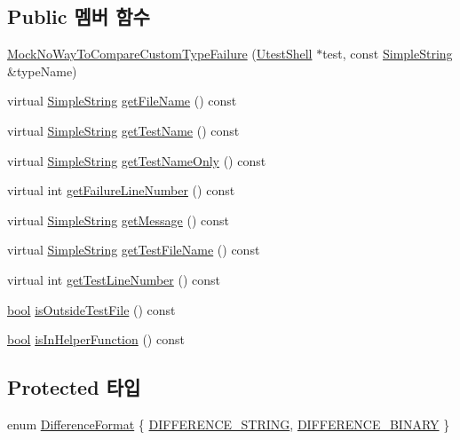 \subsection*{Public 멤버 함수}
\begin{DoxyCompactItemize}
\item 
\hyperlink{class_mock_no_way_to_compare_custom_type_failure_a5c1347c3850c5cfbf44f1cc8eecebdf4}{Mock\+No\+Way\+To\+Compare\+Custom\+Type\+Failure} (\hyperlink{class_utest_shell}{Utest\+Shell} $\ast$test, const \hyperlink{class_simple_string}{Simple\+String} \&type\+Name)
\item 
virtual \hyperlink{class_simple_string}{Simple\+String} \hyperlink{class_test_failure_ac74fa65c497d9a175304a14ffafcaa1a}{get\+File\+Name} () const 
\item 
virtual \hyperlink{class_simple_string}{Simple\+String} \hyperlink{class_test_failure_a02da3865d8c38e5fd122a08a5e23773e}{get\+Test\+Name} () const 
\item 
virtual \hyperlink{class_simple_string}{Simple\+String} \hyperlink{class_test_failure_ac5e7fcbcf3831504c42ee41691b0a7e7}{get\+Test\+Name\+Only} () const 
\item 
virtual int \hyperlink{class_test_failure_a9d41f8ad9667ed1f471676d49a655ec7}{get\+Failure\+Line\+Number} () const 
\item 
virtual \hyperlink{class_simple_string}{Simple\+String} \hyperlink{class_test_failure_a55ca73e984d01e477b9cc990acf7dffd}{get\+Message} () const 
\item 
virtual \hyperlink{class_simple_string}{Simple\+String} \hyperlink{class_test_failure_a2fb8d164bb0730492e0140ec8080f13f}{get\+Test\+File\+Name} () const 
\item 
virtual int \hyperlink{class_test_failure_a9fd9b831dfada83bbc2a1847918080a6}{get\+Test\+Line\+Number} () const 
\item 
\hyperlink{avb__gptp_8h_af6a258d8f3ee5206d682d799316314b1}{bool} \hyperlink{class_test_failure_a977b24b749f7dc0d279fed902991c7b4}{is\+Outside\+Test\+File} () const 
\item 
\hyperlink{avb__gptp_8h_af6a258d8f3ee5206d682d799316314b1}{bool} \hyperlink{class_test_failure_a8658daf09d68f724672ed9c7b1d94e95}{is\+In\+Helper\+Function} () const 
\end{DoxyCompactItemize}
\subsection*{Protected 타입}
\begin{DoxyCompactItemize}
\item 
enum \hyperlink{class_test_failure_aaadecd271c82449768993cbf919de0a2}{Difference\+Format} \{ \hyperlink{class_test_failure_aaadecd271c82449768993cbf919de0a2a1246a1a469970104212c9113e3f057c9}{D\+I\+F\+F\+E\+R\+E\+N\+C\+E\+\_\+\+S\+T\+R\+I\+NG}, 
\hyperlink{class_test_failure_aaadecd271c82449768993cbf919de0a2af76cc43dfdf0618b3cb16196894d5929}{D\+I\+F\+F\+E\+R\+E\+N\+C\+E\+\_\+\+B\+I\+N\+A\+RY}
 \}
\end{DoxyCompactItemize}
